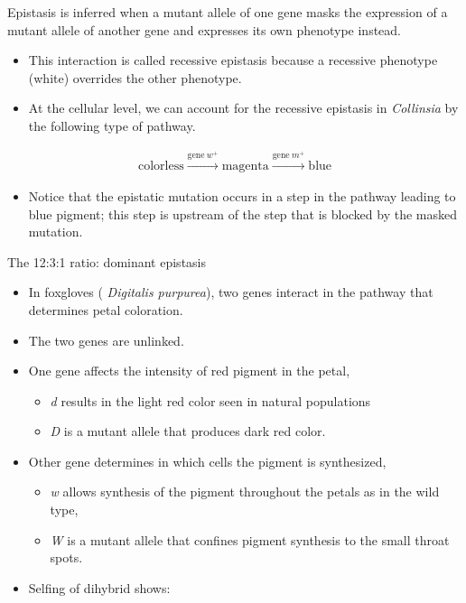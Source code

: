\documentclass[11pt,dvipsnames,ignorenonframetext,aspectratio=169]{beamer}
\providecommand{\tightlist}{%
  \setlength{\itemsep}{0pt}\setlength{\parskip}{0pt}}
\begin{document}
\begin{frame}{}
\protect\hypertarget{section-17}{}
\begin{block}{}
Epistasis is inferred when a mutant allele of one gene masks the expression of a mutant allele of another gene and expresses its own phenotype instead.
\end{block}

\begin{itemize}
\tightlist
\item
  This interaction is called recessive epistasis because a recessive
  phenotype (white) overrides the other phenotype.
\item
  At the cellular level, we can account for the recessive epistasis in
  \emph{Collinsia} by the following type of pathway.
\end{itemize}

\[
\begin{aligned}
\textrm{colorless} \xrightarrow{\text{gene}~w^+} \textrm{magenta} \xrightarrow{\text{gene}~m^+} \textrm{blue}
\end{aligned}
\]

\begin{itemize}
\tightlist
\item
  Notice that the epistatic mutation occurs in a step in the pathway
  leading to blue pigment; this step is upstream of the step that is
  blocked by the masked mutation.
\end{itemize}
\end{frame}

\begin{frame}{The 12:3:1 ratio: dominant epistasis}
\protect\hypertarget{the-1231-ratio-dominant-epistasis}{}
\begin{itemize}
\tightlist
\item
  In foxgloves ( \emph{Digitalis purpurea}), two genes interact in the
  pathway that determines petal coloration.
\item
  The two genes are unlinked.
\item
  One gene affects the intensity of red pigment in the petal,

  \begin{itemize}
  \tightlist
  \item
    \emph{d} results in the light red color seen in natural populations
  \item
    \emph{D} is a mutant allele that produces dark red color.
  \end{itemize}
\item
  Other gene determines in which cells the pigment is synthesized,

  \begin{itemize}
  \tightlist
  \item
    \emph{w} allows synthesis of the pigment throughout the petals as in
    the wild type,
  \item
    \emph{W} is a mutant allele that confines pigment synthesis to the
    small throat spots.
  \end{itemize}
\item
  Selfing of dihybrid shows:
\end{itemize}
\end{frame}
\end{document}
